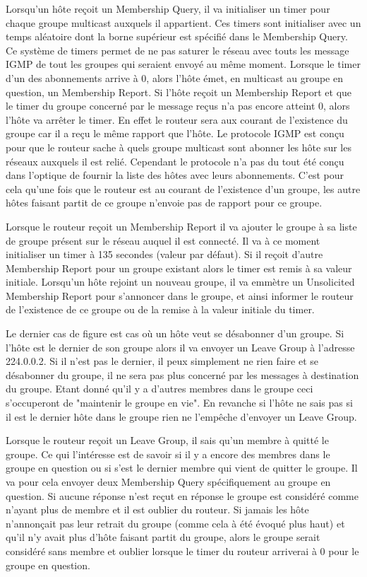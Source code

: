 Lorsqu'un hôte reçoit un Membership Query, il va initialiser un timer pour chaque
groupe multicast auxquels il appartient. Ces timers sont initialiser avec un temps
aléatoire dont la borne supérieur est spécifié dans le Membership Query. Ce système
de timers permet de ne pas saturer le réseau avec touts les message IGMP de tout les
groupes qui seraient envoyé au même moment.
Lorsque le timer d'un des abonnements arrive à 0, alors l'hôte émet, en multicast au
groupe en question, un Membership Report.
Si l'hôte reçoit un Membership Report et que le timer du groupe concerné par le
message reçus n'a pas encore atteint 0, alors l'hôte va arrêter le timer. En effet le
routeur sera aux courant de l'existence du groupe car il a reçu le même rapport que
l'hôte.
Le protocole IGMP est conçu pour que le routeur sache à quels groupe multicast sont
abonner les hôte sur les réseaux auxquels il est relié. Cependant le protocole n'a pas
du tout été conçu dans l'optique de fournir la liste des hôtes avec leurs abonnements.
C'est pour cela qu'une fois que le routeur est au courant de l'existence d'un groupe,
les autre hôtes faisant partit de ce groupe n'envoie pas de rapport pour ce groupe.

Lorsque le routeur reçoit un Membership Report il va ajouter le groupe à sa liste de groupe
présent sur le réseau auquel il est connecté. Il va à ce moment initialiser un timer
à 135 secondes (valeur par défaut).
Si il reçoit d'autre Membership Report pour un groupe existant alors le timer est
remis à sa valeur initiale.
Lorsqu'un hôte rejoint un nouveau groupe, il va emmètre un Unsolicited Membership Report
pour s'annoncer dans le groupe, et ainsi informer le routeur de l'existence de ce groupe
ou de la remise à la valeur initiale du timer.

Le dernier cas de figure est cas où un hôte veut se désabonner d'un groupe. Si l'hôte
est le dernier de son groupe alors il va envoyer un Leave Group à l'adresse 224.0.0.2.
Si il n'est pas le dernier, il peux simplement ne rien faire et se désabonner du groupe,
il ne sera pas plus concerné par les messages à destination du groupe. Etant donné qu'il
y a d'autres membres dans le groupe ceci s'occuperont de "maintenir le groupe en vie".
En revanche si l'hôte ne sais pas si il est le dernier hôte dans le groupe rien ne l'empêche
d'envoyer un Leave Group.

Lorsque le routeur reçoit un Leave Group, il sais qu'un membre à quitté le groupe. Ce qui
l'intéresse est de savoir si il y a encore des membres dans le groupe en question ou
si s'est le dernier membre qui vient de quitter le groupe. Il va pour cela envoyer deux
Membership Query spécifiquement au groupe en question. Si aucune réponse n'est reçut en
réponse le groupe est considéré comme n'ayant plus de membre et il est oublier du routeur.
Si jamais les hôte n'annonçait pas leur retrait du groupe (comme cela à été évoqué plus haut)
et qu'il n'y avait plus d'hôte faisant partit du groupe, alors le groupe serait considéré
sans membre et oublier lorsque le timer du routeur arriverai à 0 pour le groupe en question.

